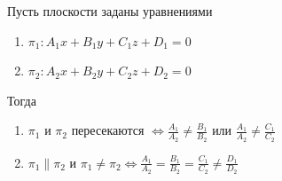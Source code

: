 \documentclass[a4paper]{article}
\begin{document}
    \begin{htheorem}
        Пусть плоскости заданы уравнениями \begin{enumerate}
                                               \item $\pi_1: A_1x+B_1y+C_1z+D_1 = 0$
                                               \item $\pi_2: A_2x+B_2y+C_2z+D_2 = 0$
        \end{enumerate}

        Тогда\begin{enumerate}
                 \item $\pi_1$ и $\pi_2$ пересекаются $\displaystyle \Leftrightarrow \frac{A_1}{A_2} \neq \frac{B_1}{B_2}$ или $\displaystyle \frac{A_1}{A_2} \neq \frac{C_1}{C_2}$

                 \item $\pi_1 \parallel \pi_2$ и $\pi_1 \neq \pi_2 \Leftrightarrow \displaystyle \frac{A_1}{A_2} = \frac{B_1}{B_2} = \frac{C_1}{C_2} \neq \frac{D_1}{D_2}$
        \end{enumerate}
    \end{htheorem}
\end{document}

